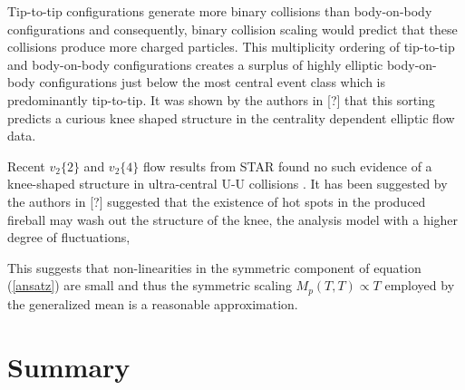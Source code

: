 \documentclass[aps,prl,reprint,amsmath,nofootinbib]{revtex4-1}
\begin{document}
Tip-to-tip configurations generate more binary collisions than body-on-body configurations and consequently, binary collision scaling would predict that these 
collisions produce more charged particles. This multiplicity ordering of tip-to-tip and body-on-body configurations creates a surplus of highly elliptic 
body-on-body configurations just below the most central event class which is predominantly tip-to-tip. It was shown by the authors in [?] that this sorting predicts 
a curious knee shaped structure in the centrality dependent elliptic flow data. 

Recent $v_2\{2\}$ and $v_2\{4\}$ flow results from STAR found no such evidence of a knee-shaped structure in ultra-central U-U collisions \cite{UU-STAR}. It has been
suggested by the authors in [?] suggested that the existence of hot spots in the produced fireball may wash out the structure of the knee, the analysis model with a higher degree of fluctuations,

This suggests that non-linearities in the symmetric component of equation (\ref{ansatz}) are small and thus the symmetric scaling $M_p(T,T) \propto T$ employed by the generalized mean
is a reasonable approximation.


\section{Summary}


\end{document}
